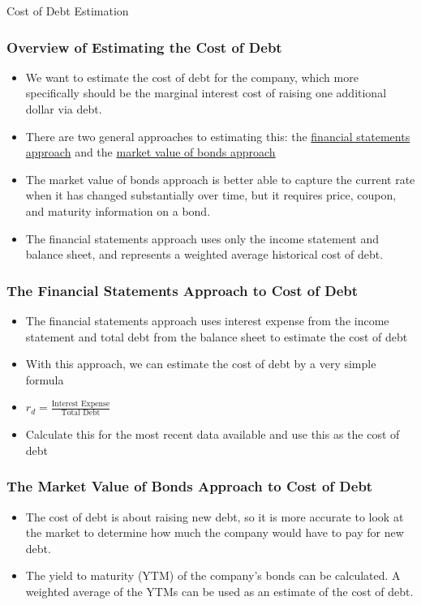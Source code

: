 \documentclass[handout, 11pt]{beamer}
\begin{document}
\begin{section}[Debt]{Cost of Debt Estimation}
\begin{frame}
\frametitle{Overview of Estimating the Cost of Debt}
\begin{itemize}
\item We want to estimate the cost of debt for the company, which more specifically should be the marginal interest cost of raising one additional dollar via debt.
\vfill
\item There are two general approaches to estimating this: the
\underline{financial statements approach}
and the
\underline{market value of bonds approach}
\vfill
\item The market value of bonds approach is better able to capture the current rate when it has changed substantially over time, but it requires price, coupon, and maturity information on a bond.
\vfill
\item The financial statements approach uses only the income statement and balance sheet, and represents a weighted average historical cost of debt.
\end{itemize}
\end{frame}
\begin{frame}
\frametitle{The Financial Statements Approach to Cost of Debt}
\begin{itemize}
\item The financial statements approach uses interest expense from the income statement and total debt from the balance sheet to estimate the cost of debt
\vfill
\item With this approach, we can estimate the cost of debt by a very simple formula
\vfill
\item $r_d = \frac{\text{Interest Expense}}{\text{Total Debt}}$
\vfill
\item Calculate this for the most recent data available and use this as the cost of debt
\end{itemize}
\end{frame}
\begin{frame}
\frametitle{The Market Value of Bonds Approach to Cost of Debt}
\begin{itemize}
\item The cost of debt is about raising new debt, so it is more accurate to look at the market to determine how much the company would have to pay for new debt.
\vfill
\item The yield to maturity (YTM) of the company's bonds can be calculated. A weighted average of the YTMs can be used as an estimate of the cost of debt.

\end{itemize}
\end{frame}
\end{section}
\end{document}
